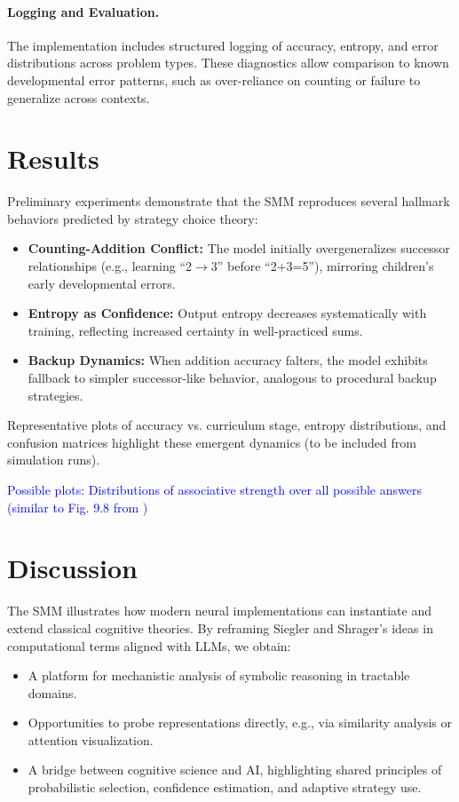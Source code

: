 \documentclass{article}
\newcommand{\rrsuggestion}[1]{\textcolor{blue}{#1}}
\begin{document}
\paragraph{Logging and Evaluation.} The implementation includes structured logging of accuracy, entropy, and error distributions across problem types. These diagnostics allow comparison to known developmental error patterns, such as over-reliance on counting or failure to generalize across contexts.

\section{Results}
Preliminary experiments demonstrate that the SMM reproduces several hallmark behaviors predicted by strategy choice theory:
\begin{itemize}
  \item \textbf{Counting-Addition Conflict:} The model initially overgeneralizes successor relationships (e.g., learning ``2$\to$3'' before ``2+3=5''), mirroring children's early developmental errors.
  \item \textbf{Entropy as Confidence:} Output entropy decreases systematically with training, reflecting increased certainty in well-practiced sums.
  \item \textbf{Backup Dynamics:} When addition accuracy falters, the model exhibits fallback to simpler successor-like behavior, analogous to procedural backup strategies.
\end{itemize}

Representative plots of accuracy vs. curriculum stage, entropy distributions, and confusion matrices highlight these emergent dynamics (to be included from simulation runs).

\rrsuggestion{Possible plots: Distributions of associative strength over all possible answers (similar to Fig. 9.8 from \citet{siegler1984strategychoices})}

\section{Discussion}
The SMM illustrates how modern neural implementations can instantiate and extend classical cognitive theories. By reframing Siegler and Shrager's ideas in computational terms aligned with LLMs, we obtain:
\begin{itemize}
  \item A platform for mechanistic analysis of symbolic reasoning in tractable domains.
  \item Opportunities to probe representations directly, e.g., via similarity analysis or attention visualization.
  \item A bridge between cognitive science and AI, highlighting shared principles of probabilistic selection, confidence estimation, and adaptive strategy use.
\end{itemize}
\end{document}
